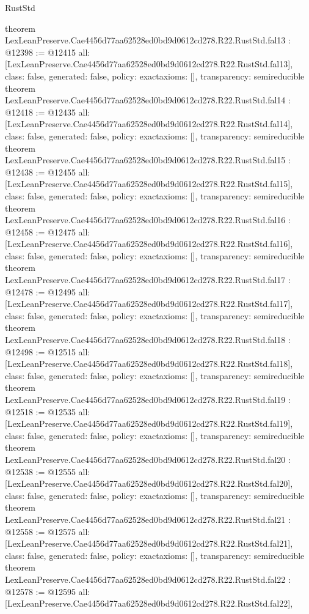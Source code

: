 \begin{lexlean}{RustStd}
\begin{coremodule}
{}
theorem LexLeanPreserve.Cae4456d77aa62528ed0bd9d0612cd278.R22.RustStd.fal13 : @12398 := @12415 {
  all: [LexLeanPreserve.Cae4456d77aa62528ed0bd9d0612cd278.R22.RustStd.fal13],
  class: false,
  generated: false,
  policy: exact{axioms: []},
  transparency: semireducible
}
theorem LexLeanPreserve.Cae4456d77aa62528ed0bd9d0612cd278.R22.RustStd.fal14 : @12418 := @12435 {
  all: [LexLeanPreserve.Cae4456d77aa62528ed0bd9d0612cd278.R22.RustStd.fal14],
  class: false,
  generated: false,
  policy: exact{axioms: []},
  transparency: semireducible
}
theorem LexLeanPreserve.Cae4456d77aa62528ed0bd9d0612cd278.R22.RustStd.fal15 : @12438 := @12455 {
  all: [LexLeanPreserve.Cae4456d77aa62528ed0bd9d0612cd278.R22.RustStd.fal15],
  class: false,
  generated: false,
  policy: exact{axioms: []},
  transparency: semireducible
}
theorem LexLeanPreserve.Cae4456d77aa62528ed0bd9d0612cd278.R22.RustStd.fal16 : @12458 := @12475 {
  all: [LexLeanPreserve.Cae4456d77aa62528ed0bd9d0612cd278.R22.RustStd.fal16],
  class: false,
  generated: false,
  policy: exact{axioms: []},
  transparency: semireducible
}
theorem LexLeanPreserve.Cae4456d77aa62528ed0bd9d0612cd278.R22.RustStd.fal17 : @12478 := @12495 {
  all: [LexLeanPreserve.Cae4456d77aa62528ed0bd9d0612cd278.R22.RustStd.fal17],
  class: false,
  generated: false,
  policy: exact{axioms: []},
  transparency: semireducible
}
theorem LexLeanPreserve.Cae4456d77aa62528ed0bd9d0612cd278.R22.RustStd.fal18 : @12498 := @12515 {
  all: [LexLeanPreserve.Cae4456d77aa62528ed0bd9d0612cd278.R22.RustStd.fal18],
  class: false,
  generated: false,
  policy: exact{axioms: []},
  transparency: semireducible
}
theorem LexLeanPreserve.Cae4456d77aa62528ed0bd9d0612cd278.R22.RustStd.fal19 : @12518 := @12535 {
  all: [LexLeanPreserve.Cae4456d77aa62528ed0bd9d0612cd278.R22.RustStd.fal19],
  class: false,
  generated: false,
  policy: exact{axioms: []},
  transparency: semireducible
}
theorem LexLeanPreserve.Cae4456d77aa62528ed0bd9d0612cd278.R22.RustStd.fal20 : @12538 := @12555 {
  all: [LexLeanPreserve.Cae4456d77aa62528ed0bd9d0612cd278.R22.RustStd.fal20],
  class: false,
  generated: false,
  policy: exact{axioms: []},
  transparency: semireducible
}
theorem LexLeanPreserve.Cae4456d77aa62528ed0bd9d0612cd278.R22.RustStd.fal21 : @12558 := @12575 {
  all: [LexLeanPreserve.Cae4456d77aa62528ed0bd9d0612cd278.R22.RustStd.fal21],
  class: false,
  generated: false,
  policy: exact{axioms: []},
  transparency: semireducible
}
theorem LexLeanPreserve.Cae4456d77aa62528ed0bd9d0612cd278.R22.RustStd.fal22 : @12578 := @12595 {
  all: [LexLeanPreserve.Cae4456d77aa62528ed0bd9d0612cd278.R22.RustStd.fal22],
}
\end{coremodule}
\end{lexlean}
